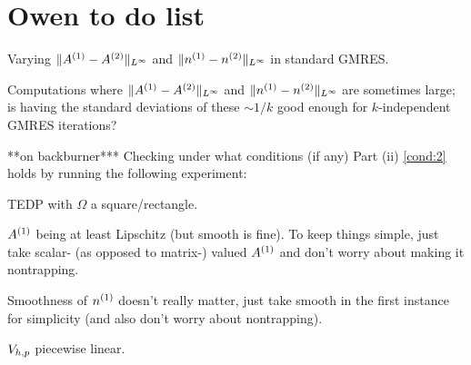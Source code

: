 
%
%
%

\section*{Owen to do list}
\ben
\item Varying  $\|{A}^{(1)}-{A}^{(2)}\|_{L^\infty}$ and $\|{n}^{(1)}-{n}^{(2)}\|_{L^\infty}$ in standard GMRES.
\item Computations where $\|{A}^{(1)}-{A}^{(2)}\|_{L^\infty}$ and $\|{n}^{(1)}-{n}^{(2)}\|_{L^\infty}$ are sometimes large; is having the standard deviations of these $\sim 1/k$ good enough for $k$-independent GMRES iterations?
\item ***on backburner*** Checking under what conditions (if any) Part (ii) \cref{cond:2} holds by running the following experiment:
\bit
\item TEDP with $\Omega$ a square/rectangle.
\item ${A}^{(1)}$ being at least Lipschitz (but smooth is fine). To keep things simple, just take scalar- (as opposed to matrix-) valued ${A}^{(1)}$ and don't worry about making it nontrapping.
\item Smoothness of ${n}^{(1)}$ doesn't really matter, just take smooth in the first instance for simplicity (and also don't worry about nontrapping).
\item $V_{h,p}$ piecewise linear.

